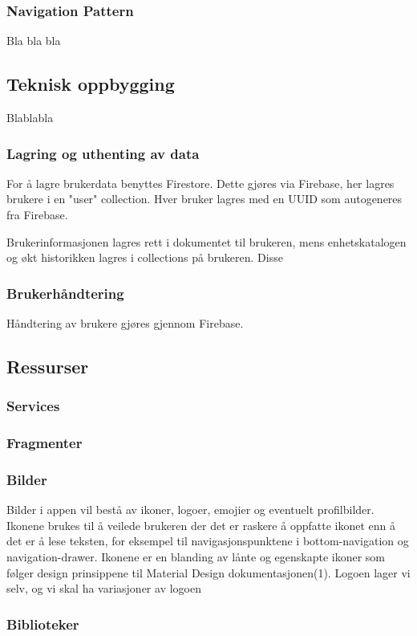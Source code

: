 \subsubsection{Navigation Pattern}
Bla bla bla

\subsection{Teknisk oppbygging}
Blablabla

\subsubsection{Lagring og uthenting av data}
For å lagre brukerdata benyttes Firestore. Dette gjøres via Firebase, her lagres brukere i en "user" collection. Hver bruker lagres med en UUID som autogeneres fra Firebase. 

Brukerinformasjonen lagres rett i dokumentet til brukeren, mens enhetskatalogen og økt historikken lagres i collections på brukeren. 
Disse 

\subsubsection{Brukerhåndtering}
Håndtering av brukere gjøres gjennom Firebase.

\subsection{Ressurser}
\subsubsection{Services}


\subsubsection{Fragmenter}

\subsubsection{Bilder}
Bilder i appen vil bestå av ikoner, logoer, emojier og eventuelt profilbilder. Ikonene brukes til å veilede brukeren der det er raskere å oppfatte ikonet enn å det er å lese teksten, for eksempel til navigasjonspunktene i bottom-navigation og navigation-drawer. Ikonene er en blanding av lånte og egenskapte ikoner som følger design prinsippene til Material Design dokumentasjonen(1). Logoen lager vi selv, og vi skal ha variasjoner av logoen 

\subsubsection{Biblioteker}